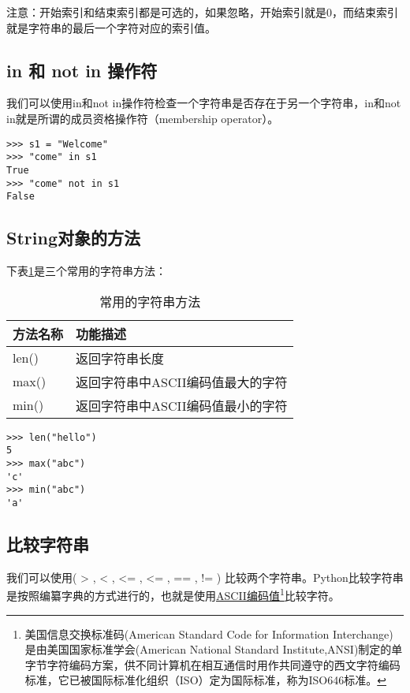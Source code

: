 注意：开始索引和结束索引都是可选的，如果忽略，开始索引就是0，而结束索引就是字符串的最后一个字符对应的索引值。

\subsection{in 和 not in 操作符}

我们可以使用in和not in操作符检查一个字符串是否存在于另一个字符串，in和not in就是所谓的成员资格操作符（membership operator）。

\begin{lstlisting}
>>> s1 = "Welcome"
>>> "come" in s1
True
>>> "come" not in s1
False
\end{lstlisting}

\subsection{String对象的方法}

下表\ref{tab:常用的字符串方法}是三个常用的字符串方法：
\begin{table}[ht]
  \centering
  \caption{常用的字符串方法}
    \begin{tabular}{ll}
    \toprule
    \textbf{方法名称} & \textbf{功能描述} \\
    \midrule
    len()   & 返回字符串长度 \\
    max()   & 返回字符串中ASCII编码值最大的字符 \\
    min()   & 返回字符串中ASCII编码值最小的字符 \\
    \bottomrule
    \end{tabular}%
  \label{tab:常用的字符串方法}%
\end{table}%

\begin{lstlisting}
>>> len("hello")
5
>>> max("abc")
'c'
>>> min("abc")
'a'
\end{lstlisting}

\subsection{比较字符串}

我们可以使用( > , < , <= , <= , == , !=  ) 比较两个字符串。Python比较字符串是按照编纂字典的方式进行的，也就是使用\href{http://tool.oschina.net/commons?type=4}{ASCII编码值}\footnote{美国信息交换标准码(American Standard Code for Information Interchange)是由美国国家标准学会(American National Standard Institute,ANSI)制定的单字节字符编码方案，供不同计算机在相互通信时用作共同遵守的西文字符编码标准，它已被国际标准化组织（ISO）定为国际标准，称为ISO646标准。}比较字符。

